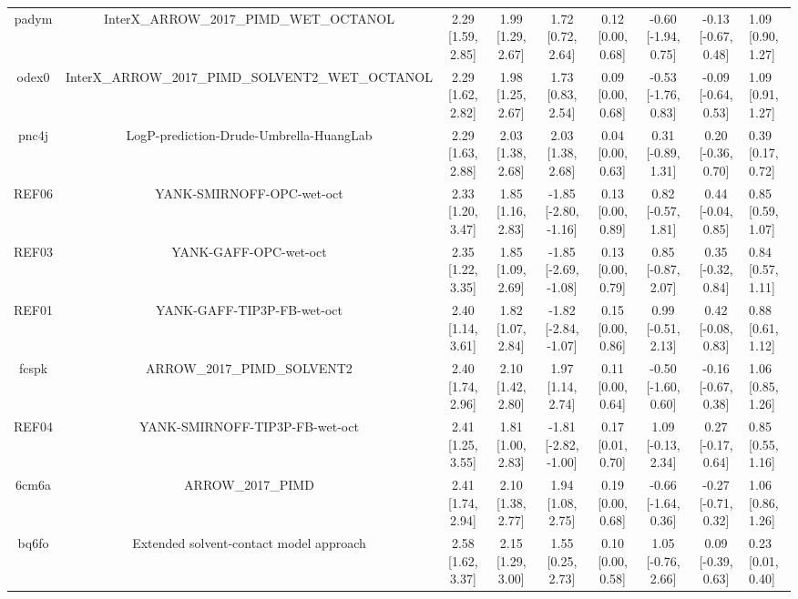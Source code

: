 \documentclass{article}
\begin{document}
\begin{center}
\begin{longtable}{|cccccccc|}
 padym &            InterX\_ARROW\_2017\_PIMD\_WET\_OCTANOL &  2.29 [1.59, 2.85] &  1.99 [1.29, 2.67] &     1.72 [0.72, 2.64] &  0.12 [0.00, 0.68] &  -0.60 [-1.94, 0.75] &  -0.13 [-0.67, 0.48] &     1.09 [0.90, 1.27] \\
 odex0 &  InterX\_ARROW\_2017\_PIMD\_SOLVENT2\_WET\_OCTANOL &  2.29 [1.62, 2.82] &  1.98 [1.25, 2.67] &     1.73 [0.83, 2.54] &  0.09 [0.00, 0.68] &  -0.53 [-1.76, 0.83] &  -0.09 [-0.64, 0.53] &     1.09 [0.91, 1.27] \\
 pnc4j &            LogP-prediction-Drude-Umbrella-HuangLab &  2.29 [1.63, 2.88] &  2.03 [1.38, 2.68] &     2.03 [1.38, 2.68] &  0.04 [0.00, 0.63] &   0.31 [-0.89, 1.31] &   0.20 [-0.36, 0.70] &     0.39 [0.17, 0.72] \\
 REF06 &                          YANK-SMIRNOFF-OPC-wet-oct &  2.33 [1.20, 3.47] &  1.85 [1.16, 2.83] &  -1.85 [-2.80, -1.16] &  0.13 [0.00, 0.89] &   0.82 [-0.57, 1.81] &   0.44 [-0.04, 0.85] &     0.85 [0.59, 1.07] \\
 REF03 &                              YANK-GAFF-OPC-wet-oct &  2.35 [1.22, 3.35] &  1.85 [1.09, 2.69] &  -1.85 [-2.69, -1.08] &  0.13 [0.00, 0.79] &   0.85 [-0.87, 2.07] &   0.35 [-0.32, 0.84] &     0.84 [0.57, 1.11] \\
 REF01 &                         YANK-GAFF-TIP3P-FB-wet-oct &  2.40 [1.14, 3.61] &  1.82 [1.07, 2.84] &  -1.82 [-2.84, -1.07] &  0.15 [0.00, 0.86] &   0.99 [-0.51, 2.13] &   0.42 [-0.08, 0.83] &     0.88 [0.61, 1.12] \\
 fcspk &                        ARROW\_2017\_PIMD\_SOLVENT2 &  2.40 [1.74, 2.96] &  2.10 [1.42, 2.80] &     1.97 [1.14, 2.74] &  0.11 [0.00, 0.64] &  -0.50 [-1.60, 0.60] &  -0.16 [-0.67, 0.38] &     1.06 [0.85, 1.26] \\
 REF04 &                     YANK-SMIRNOFF-TIP3P-FB-wet-oct &  2.41 [1.25, 3.55] &  1.81 [1.00, 2.83] &  -1.81 [-2.82, -1.00] &  0.17 [0.01, 0.70] &   1.09 [-0.13, 2.34] &   0.27 [-0.17, 0.64] &     0.85 [0.55, 1.16] \\
 6cm6a &                                  ARROW\_2017\_PIMD &  2.41 [1.74, 2.94] &  2.10 [1.38, 2.77] &     1.94 [1.08, 2.75] &  0.19 [0.00, 0.68] &  -0.66 [-1.64, 0.36] &  -0.27 [-0.71, 0.32] &     1.06 [0.86, 1.26] \\
 bq6fo &            Extended solvent-contact model approach &  2.58 [1.62, 3.37] &  2.15 [1.29, 3.00] &     1.55 [0.25, 2.73] &  0.10 [0.00, 0.58] &   1.05 [-0.76, 2.66] &   0.09 [-0.39, 0.63] &     0.23 [0.01, 0.40] \\

\end{longtable}
\end{center}
\end{document}
